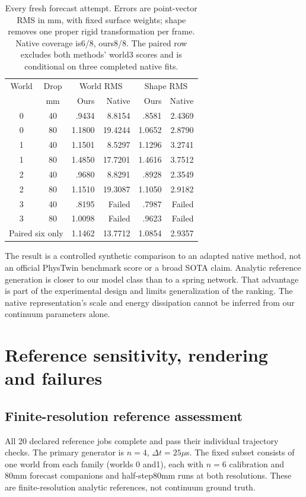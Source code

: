 \documentclass[10pt,twocolumn,letterpaper]{article}
\begin{document}
\begin{table}[t]
\centering\small
\begin{tabular}{ccrrrr}
\toprule
World & Drop & \multicolumn{2}{c}{World RMS} & \multicolumn{2}{c}{Shape RMS}\\
& mm & Ours & Native & Ours & Native\\
\midrule
0&40&.9434&8.8154&.8581&2.4369\\
0&80&1.1800&19.4244&1.0652&2.8790\\
1&40&1.1501&8.5297&1.1296&3.2741\\
1&80&1.4850&17.7201&1.4616&3.7512\\
2&40&.9680&8.8291&.8928&2.3549\\
2&80&1.1510&19.3087&1.1050&2.9182\\
3&40&.8195&Failed&.7987&Failed\\
3&80&1.0098&Failed&.9623&Failed\\
\midrule
\multicolumn{2}{l}{Paired six only}&1.1462&13.7712&1.0854&2.9357\\
\bottomrule
\end{tabular}
\caption{Every fresh forecast attempt. Errors are point-vector RMS in mm, with fixed surface weights; shape removes one proper rigid transformation per frame. Native coverage is6/8, ours8/8. The paired row excludes both methods' world3 scores and is conditional on three completed native fits.}
\label{tab:fresh}
\end{table}

The result is a controlled synthetic comparison to an adapted native method, not an official PhysTwin benchmark score or a broad SOTA claim. Analytic reference generation is closer to our model class than to a spring network. That advantage is part of the experimental design and limits generalization of the ranking. The native representation's scale and energy dissipation cannot be inferred from our continuum parameters alone.

\section{Reference sensitivity, rendering and failures}
\subsection{Finite-resolution reference assessment}
All 20 declared reference jobs complete and pass their individual trajectory checks. The primary generator is $n=4$, $\Delta t=25\mu$s. The fixed subset consists of one world from each family (worlds 0 and1), each with $n=6$ calibration and 80mm forecast companions and half-step80mm runs at both resolutions. These are finite-resolution analytic references, not continuum ground truth.
\end{document}
